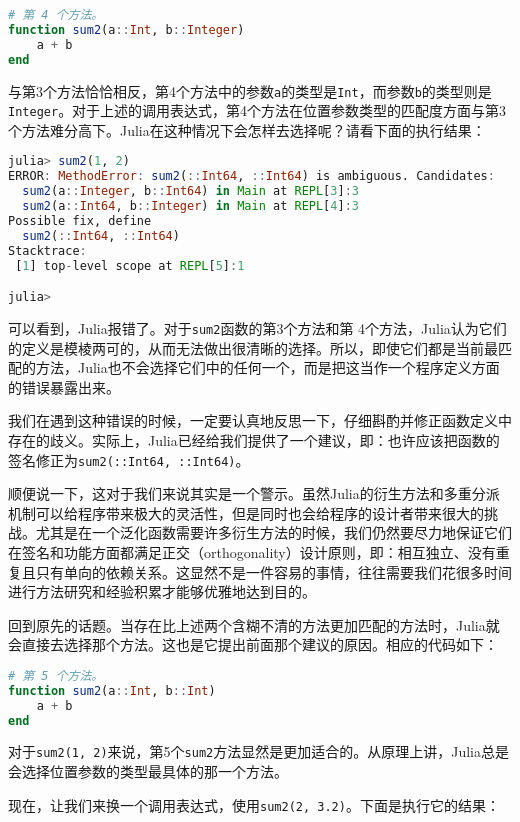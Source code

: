 \begin{lstlisting}[language=julia]
# 第 4 个方法。
function sum2(a::Int, b::Integer)
    a + b
end
\end{lstlisting}

与第3个方法恰恰相反，第4个方法中的参数\verb|a|的类型是\verb|Int|，而参数\verb|b|的类型则是\verb|Integer|。对于上述的调用表达式，第4个方法在位置参数类型的匹配度方面与第3个方法难分高下。Julia在这种情况下会怎样去选择呢？请看下面的执行结果：

\begin{lstlisting}[language=julia]
julia> sum2(1, 2)
ERROR: MethodError: sum2(::Int64, ::Int64) is ambiguous. Candidates:
  sum2(a::Integer, b::Int64) in Main at REPL[3]:3
  sum2(a::Int64, b::Integer) in Main at REPL[4]:3
Possible fix, define
  sum2(::Int64, ::Int64)
Stacktrace:
 [1] top-level scope at REPL[5]:1

julia> 
\end{lstlisting}

可以看到，Julia报错了。对于\verb|sum2|函数的第3个方法和第 4个方法，Julia认为它们的定义是模棱两可的，从而无法做出很清晰的选择。所以，即使它们都是当前最匹配的方法，Julia也不会选择它们中的任何一个，而是把这当作一个程序定义方面的错误暴露出来。

我们在遇到这种错误的时候，一定要认真地反思一下，仔细斟酌并修正函数定义中存在的歧义。实际上，Julia已经给我们提供了一个建议，即：也许应该把函数的签名修正为\verb|sum2(::Int64, ::Int64)|。

顺便说一下，这对于我们来说其实是一个警示。虽然Julia的衍生方法和多重分派机制可以给程序带来极大的灵活性，但是同时也会给程序的设计者带来很大的挑战。尤其是在一个泛化函数需要许多衍生方法的时候，我们仍然要尽力地保证它们在签名和功能方面都满足正交（orthogonality）设计原则，即：相互独立、没有重复且只有单向的依赖关系。这显然不是一件容易的事情，往往需要我们花很多时间进行方法研究和经验积累才能够优雅地达到目的。

回到原先的话题。当存在比上述两个含糊不清的方法更加匹配的方法时，Julia就会直接去选择那个方法。这也是它提出前面那个建议的原因。相应的代码如下：

\begin{lstlisting}[language=julia]
# 第 5 个方法。
function sum2(a::Int, b::Int)
    a + b
end
\end{lstlisting}

对于\verb|sum2(1, 2)|来说，第5个\verb|sum2|方法显然是更加适合的。从原理上讲，Julia总是会选择位置参数的类型最具体的那一个方法。

现在，让我们来换一个调用表达式，使用\verb|sum2(2, 3.2)|。下面是执行它的结果：

